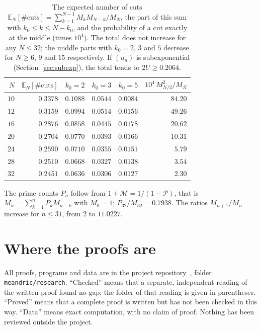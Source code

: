 \begin{table}[H]
\centering
\begin{tabular}{rrrrrr}
\toprule
$N$ & $\mathbb E_N[\#\text{cuts}]$ & $k_0=2$ & $k_0=3$ & $k_0=5$ & $10^4\,M_{N/2}^2/M_N$\\
\midrule
$10$ & $0.3378$ & $0.1088$ & $0.0544$ & $0.0084$ & $84.20$\\
$12$ & $0.3159$ & $0.0994$ & $0.0514$ & $0.0156$ & $49.26$\\
$16$ & $0.2876$ & $0.0858$ & $0.0445$ & $0.0178$ & $20.62$\\
$20$ & $0.2704$ & $0.0770$ & $0.0393$ & $0.0166$ & $10.31$\\
$24$ & $0.2590$ & $0.0710$ & $0.0355$ & $0.0151$ & $5.79$\\
$28$ & $0.2510$ & $0.0668$ & $0.0327$ & $0.0138$ & $3.54$\\
$32$ & $0.2451$ & $0.0636$ & $0.0306$ & $0.0127$ & $2.30$\\
\bottomrule
\end{tabular}
\caption{The expected number of cuts $\mathbb E_N[\#\text{cuts}]=\sum_{k=1}^{N-1}M_kM_{N-k}/M_N$, the
part of this sum with $k_0\le k\le N-k_0$, and the probability of a cut exactly at the middle (times
$10^4$). The total does not increase for any $N\le32$; the middle parts with $k_0=2$, $3$ and $5$
decrease for $N\ge6$, $9$ and $15$ respectively. If $(u_n)$ is subexponential (Section~\ref{sec:subexp}), the total tends to $2U\ge0.2064$.}
\label{tab:cuts}
\end{table}

The prime counts $P_n$ follow from $1+\mathcal M=1/(1-\mathcal P)$, that is
$M_n=\sum_{k=1}^{n}P_kM_{n-k}$ with $M_0=1$; $P_{32}/M_{32}=0.7938$. The ratios $M_{n+1}/M_n$ increase for
$n\le31$, from $2$ to $11.0227$.

\section{Where the proofs are}\label{app:repo}

All proofs, programs and data are in the project repository~\cite{Repo}, folder
\texttt{meandric/research}. ``Checked'' means that a separate, independent reading of the written
proof found no gap; the folder of that reading is given in parentheses. ``Proved'' means that a
complete proof is written but has not been checked in this way. ``Data'' means exact computation, with
no claim of proof. Nothing has been reviewed outside the project.

